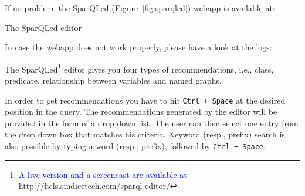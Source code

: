 
If no problem, the SparQLed (Figure~\ref{fig:sparqled}) webapp is available at:

\bigskip
\begin{raggedleft}
\end{raggedleft}

\begin{marginfigure}
    \caption{The SparQLed editor}
    \label{fig:sparqled}
\end{marginfigure}
 
In case the webapp does not work properly, please have a look at the logs:

\bigskip
\begin{raggedleft}
\end{raggedleft}

The SparQLed\footnote{\textcolor{blue}{A live version and a screencast are available at \url{http://hcls.sindicetech.com/sparql-editor/}}} editor gives you four types of recommendations, i.e., class, predicate, relationship between variables and named graphs.

In order to get recommendations you have to hit \texttt{Ctrl + Space} at the desired position in the query. The recommendations generated by the editor will be provided in the form of a drop down list. The user can then select one entry from the drop down box that matches his criteria. Keyword (resp., prefix) search is also possible by typing a word (resp., prefix), followed by \texttt{Ctrl + Space}.

